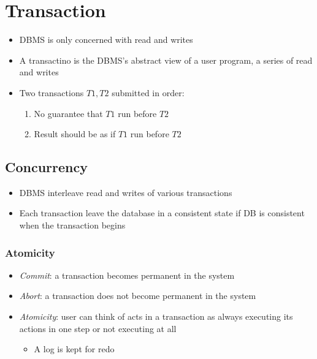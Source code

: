 \chapter{Transaction}

\begin{itemize}
  \item DBMS is only concerned with read and writes
  \item A transactino is the DBMS's abstract view of a user program, a series
  of read and writes
  \item Two transactions $ T1, T2 $ submitted in order:
  \begin{enumerate}
    \item No guarantee that $ T1 $ run before $ T2 $
    \item Result should be as if $ T1 $ run before $ T2 $
  \end{enumerate}
\end{itemize}

\section{Concurrency}

  \begin{itemize}
    \item DBMS interleave read and writes of various transactions
    \item Each transaction leave the database in a consistent state if DB is
    consistent when the transaction begins
  \end{itemize}

  \subsection{Atomicity}

    \begin{itemize}
      \item \emph{Commit}: a transaction becomes permanent in the system
      \item \emph{Abort}: a transaction does not become permanent in the system
      \item \emph{Atomicity}: user can think of acts in a transaction as always
      executing its actions in one step or not executing at all
      \begin{itemize}
        \item A log is kept for redo
      \end{itemize}
    \end{itemize}

